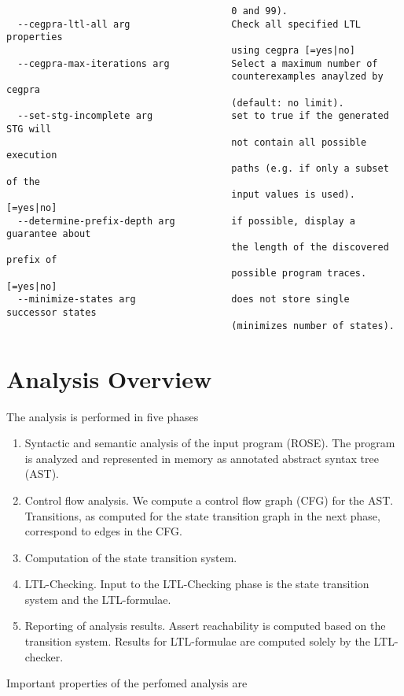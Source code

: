 \documentclass[natbib]{article}
\begin{document}
\begin{verbatim}
                                        0 and 99).
  --cegpra-ltl-all arg                  Check all specified LTL properties 
                                        using cegpra [=yes|no]
  --cegpra-max-iterations arg           Select a maximum number of 
                                        counterexamples anaylzed by cegpra 
                                        (default: no limit).
  --set-stg-incomplete arg              set to true if the generated STG will 
                                        not contain all possible execution 
                                        paths (e.g. if only a subset of the 
                                        input values is used). [=yes|no]
  --determine-prefix-depth arg          if possible, display a guarantee about 
                                        the length of the discovered prefix of 
                                        possible program traces. [=yes|no]
  --minimize-states arg                 does not store single successor states 
                                        (minimizes number of states).
\end{verbatim}

\section{Analysis Overview}

The analysis is performed in five phases

\begin{enumerate}
\item Syntactic and semantic analysis of the input program (ROSE). The program is analyzed and represented in memory as annotated abstract syntax tree (AST).
\item Control flow analysis. We compute a control flow graph (CFG) for the AST. Transitions, as computed for the state transition graph in the next phase, correspond to edges in the CFG.
\item Computation of the state transition system.
\item LTL-Checking. Input to the LTL-Checking phase is the state transition system and the LTL-formulae.
\item Reporting of analysis results. Assert reachability is computed based on the transition system. Results for LTL-formulae are computed solely by the LTL-checker.
\end{enumerate}

Important properties of the perfomed analysis are
\end{document}
